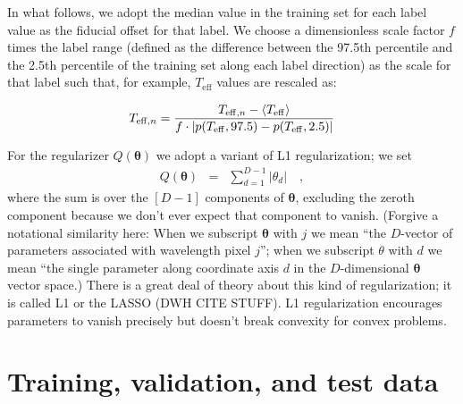 \documentclass[12pt,preprint]{aastex}
\newcommand{\Teff}{T_{\mathrm{eff}}}
\newcommand{\Dvector}[1]{\boldsymbol{#1}}
\newcommand{\vectheta}{\Dvector{\theta}}
\begin{document}
In what follows, we adopt the median value in the training set for each label 
value as the fiducial offset for that label.  We choose a dimensionless scale
factor $f$ times the label range (defined as the difference between the 97.5th
percentile and the 2.5th percentile of the training set along each label 
direction) as the scale for that label such that, for example, $\Teff$ values
are rescaled as:

\begin{eqnarray}\label{eq:label-norm}
  T_{{\rm eff},n} = \frac{T_{{\rm eff},n} - \langle\Teff\rangle}{f\cdot|p(\Teff,97.5) - p(\Teff,2.5)|}
\end{eqnarray}


\noindent{}For the regularizer $Q(\vectheta)$ we adopt a variant of L1
regularization; we set
\begin{eqnarray}
  Q(\vectheta) &=& \sum_{d=1}^{D-1} |\theta_d|
  \quad,
\end{eqnarray}
where the sum is over the $[D-1]$ components of $\vectheta$, excluding the 
zeroth component because we don't ever expect that component to vanish. 
(Forgive a notational similarity here: When we subscript $\vectheta$ with $j$ we
mean ``the $D$-vector of parameters associated with wavelength pixel $j$''; when
we subscript $\theta$ with $d$ we mean ``the single parameter along coordinate
axis $d$ in the $D$-dimensional $\vectheta$ vector space.)  There is a great 
deal of theory about this kind of regularization; it is called L1 or the LASSO
(DWH CITE STUFF).  
L1 regularization encourages parameters to vanish precisely but
doesn't break convexity for convex problems.






\section{Training, validation, and test data}
\end{document}
